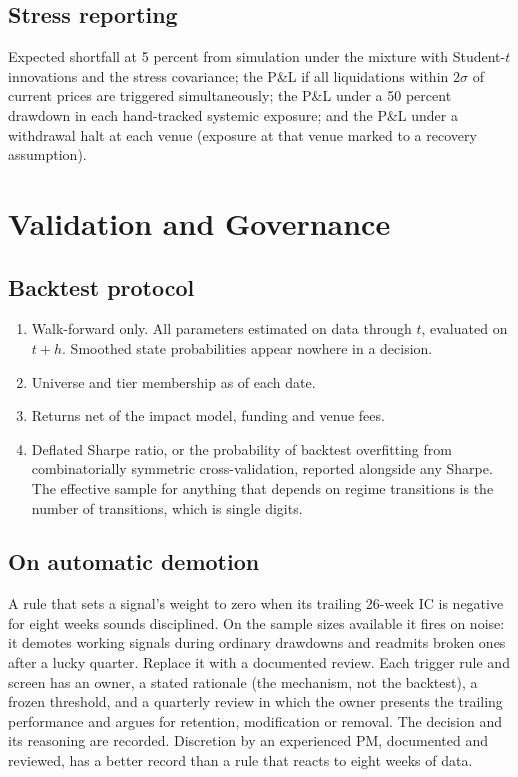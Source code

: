 \documentclass[11pt,a4paper]{article}
\theoremstyle{definition}
\begin{document}
\subsection{Stress reporting}

Expected shortfall at 5 percent from simulation under the mixture with Student-$t$ innovations and the stress covariance; the P\&L if all liquidations within $2\sigma$ of current prices are triggered simultaneously; the P\&L under a 50 percent drawdown in each hand-tracked systemic exposure; and the P\&L under a withdrawal halt at each venue (exposure at that venue marked to a recovery assumption).

\section{Validation and Governance}\label{sec:governance}

\subsection{Backtest protocol}

\begin{enumerate}[nosep]
\item Walk-forward only. All parameters estimated on data through $t$, evaluated on $t+h$. Smoothed state probabilities appear nowhere in a decision.
\item Universe and tier membership as of each date.
\item Returns net of the impact model, funding and venue fees.
\item Deflated Sharpe ratio, or the probability of backtest overfitting from combinatorially symmetric cross-validation, reported alongside any Sharpe. The effective sample for anything that depends on regime transitions is the number of transitions, which is single digits.
\end{enumerate}

\subsection{On automatic demotion}

A rule that sets a signal's weight to zero when its trailing 26-week IC is negative for eight weeks sounds disciplined. On the sample sizes available it fires on noise: it demotes working signals during ordinary drawdowns and readmits broken ones after a lucky quarter. Replace it with a documented review. Each trigger rule and screen has an owner, a stated rationale (the mechanism, not the backtest), a frozen threshold, and a quarterly review in which the owner presents the trailing performance and argues for retention, modification or removal. The decision and its reasoning are recorded. Discretion by an experienced PM, documented and reviewed, has a better record than a rule that reacts to eight weeks of data.
\end{document}

